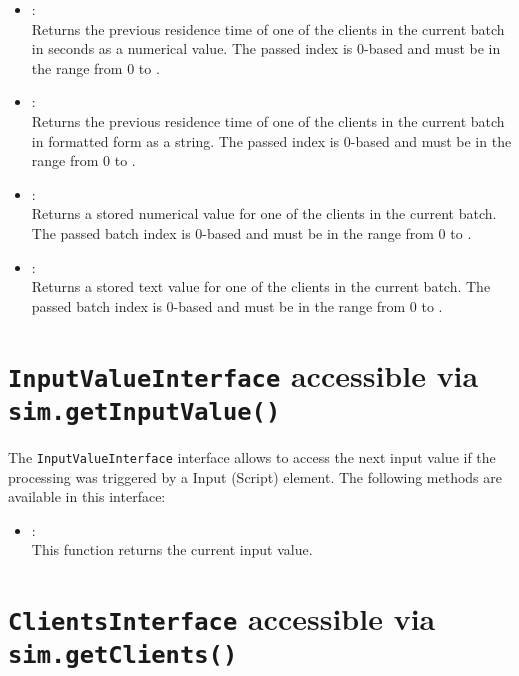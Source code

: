 \begin{itemize}
\item
{}:\\
Returns the previous residence time of one of the clients in the current batch in seconds as a numerical value.
The passed index is 0-based and must be in the range from 0 to .

\item
{}:\\
Returns the previous residence time of one of the clients in the current batch in formatted form as a string.
The passed index is 0-based and must be in the range from 0 to .

\item
{}:\\
Returns a stored numerical value for one of the clients in the current batch.
The passed batch index is 0-based and must be in the range from 0 to .

\item
{}:\\
Returns a stored text value for one of the clients in the current batch.
The passed batch index is 0-based and must be in the range from 0 to .
\end{itemize}



\chapter{\texttt{InputValueInterface} accessible via \texttt{sim.getInputValue()}}

The \texttt{InputValueInterface} interface allows to access the next input value
if the processing was triggered by a Input (Script) element.
The following methods are available in this interface:

\begin{itemize}
\item
{}:\\
This function returns the current input value.
\end{itemize}



\chapter{\texttt{ClientsInterface} accessible via \texttt{sim.getClients()}}

